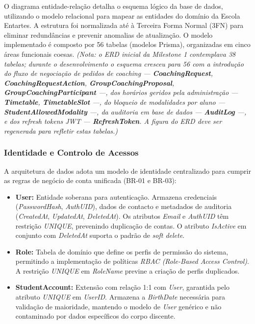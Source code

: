 \documentclass[12pt,a4paper]{report}
\begin{document}
O diagrama entidade-relação detalha o esquema lógico da base de dados, utilizando o modelo relacional para mapear as entidades do domínio da Escola Entartes. A estrutura foi normalizada até à Terceira Forma Normal (3FN) para eliminar redundâncias e prevenir anomalias de atualização. O modelo implementado é composto por 56 tabelas (modelos Prisma), organizadas em cinco áreas funcionais coesas. \textit{(Nota: o ERD inicial da Milestone 1 contemplava 38 tabelas; durante o desenvolvimento o esquema cresceu para 56 com a introdução do fluxo de negociação de pedidos de coaching --- \textbf{CoachingRequest}, \textbf{CoachingRequestAction}, \textbf{GroupCoachingProposal}, \textbf{GroupCoachingParticipant} ---, dos horários geridos pela administração --- \textbf{Timetable}, \textbf{TimetableSlot} ---, do bloqueio de modalidades por aluno --- \textbf{StudentAllowedModality} ---, da auditoria em base de dados --- \textbf{AuditLog} ---, e dos \textit{refresh tokens} JWT --- \textbf{RefreshToken}. A figura do ERD deve ser regenerada para refletir estas tabelas.)}

\subsubsection{Identidade e Controlo de Acessos}
A arquitetura de dados adota um modelo de identidade centralizado para cumprir as regras de negócio de conta unificada (BR-01 e BR-03):
\begin{itemize}
    \item \textbf{User:} Entidade soberana para autenticação. Armazena credenciais (\textit{PasswordHash}, \textit{AuthUID}), dados de contacto e metadados de auditoria (\textit{CreatedAt}, \textit{UpdatedAt}, \textit{DeletedAt}). Os atributos \textit{Email} e \textit{AuthUID} têm restrição \textit{UNIQUE}, prevenindo duplicação de contas. O atributo \textit{IsActive} em conjunto com \textit{DeletedAt} suporta o padrão de \textit{soft delete}.
    \item \textbf{Role:} Tabela de domínio que define os perfis de permissão do sistema, permitindo a implementação de políticas \textit{RBAC (Role-Based Access Control)}. A restrição \textit{UNIQUE} em \textit{RoleName} previne a criação de perfis duplicados.
    \item \textbf{StudentAccount:} Extensão com relação 1:1 com \textit{User}, garantida pelo atributo \textit{UNIQUE} em \textit{UserID}. Armazena a \textit{BirthDate} necessária para validação de maioridade, mantendo o modelo de \textit{User} genérico e não contaminado por dados específicos do corpo discente.
\end{itemize}
\end{document}
